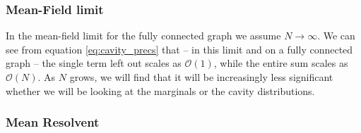 \documentclass[../main.tex]{subfiles}
\begin{document}
\subsubsection{Mean-Field limit}

In the mean-field limit for the fully connected graph we assume $N \to \infty$.
We can see from equation \ref{eq:cavity_precs} that -- in this limit and on a fully connected graph -- the single term left out scales as $\mathcal{O}(1)$, while the entire sum scales as $\mathcal{O}(N)$.
As $N$ grows, we will find that it will be increasingly less significant whether we will be looking at the marginals or the cavity distributions.

\subsubsection{Mean Resolvent}



\ifSubfilesClassLoaded{
}{
    \newpage
}
\end{document}

